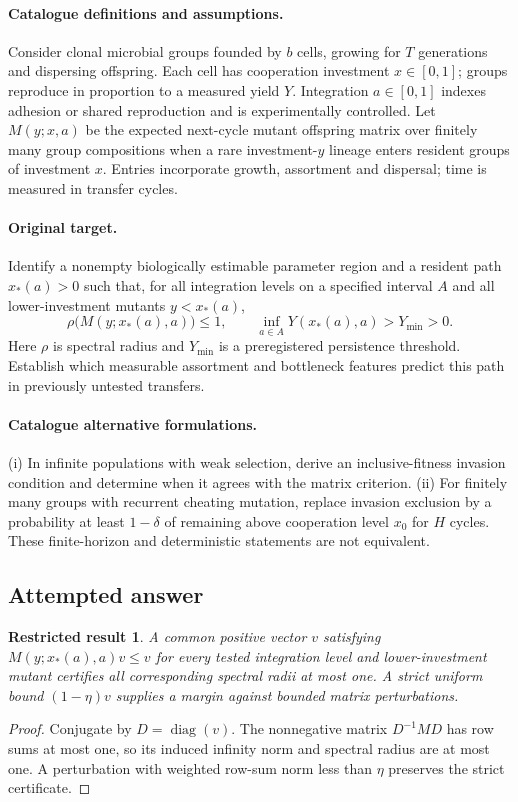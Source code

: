 \documentclass[11pt]{article}
\newtheorem{attemptresult}{Restricted result}[section]
\begin{document}
\paragraph{Catalogue definitions and assumptions.}
Consider clonal microbial groups founded by $b$ cells, growing for $T$ generations and dispersing offspring. Each cell has cooperation investment $x\in[0,1]$; groups reproduce in proportion to a measured yield $Y$. Integration $a\in[0,1]$ indexes adhesion or shared reproduction and is experimentally controlled. Let $M(y;x,a)$ be the expected next-cycle mutant offspring matrix over finitely many group compositions when a rare investment-$y$ lineage enters resident groups of investment $x$. Entries incorporate growth, assortment and dispersal; time is measured in transfer cycles.
\paragraph{Original target.}
Identify a nonempty biologically estimable parameter region and a resident path $x_*(a)>0$ such that, for all integration levels on a specified interval $A$ and all lower-investment mutants $y<x_*(a)$,
\[
 \rho\bigl(M(y;x_*(a),a)\bigr)\le1,
 \qquad \inf_{a\in A}Y(x_*(a),a)>Y_{\min}>0.
\]
Here $\rho$ is spectral radius and $Y_{\min}$ is a preregistered persistence threshold. Establish which measurable assortment and bottleneck features predict this path in previously untested transfers.
\paragraph{Catalogue alternative formulations.}
(i) In infinite populations with weak selection, derive an inclusive-fitness invasion condition and determine when it agrees with the matrix criterion. (ii) For finitely many groups with recurrent cheating mutation, replace invasion exclusion by a probability at least $1-\delta$ of remaining above cooperation level $x_0$ for $H$ cycles. These finite-horizon and deterministic statements are not equivalent.
\subsection{Attempted answer}
\begin{attemptresult}
A common positive vector $v$ satisfying $M(y;x_*(a),a)v\leq v$ for every tested integration level and lower-investment mutant certifies all corresponding spectral radii at most one. A strict uniform bound $(1-\eta)v$ supplies a margin against bounded matrix perturbations.
\end{attemptresult}
\begin{proof}
Conjugate by $D=\operatorname{diag}(v)$. The nonnegative matrix $D^{-1}MD$ has row sums at most one, so its induced infinity norm and spectral radius are at most one. A perturbation with weighted row-sum norm less than $\eta$ preserves the strict certificate.
\end{proof}
\end{document}
